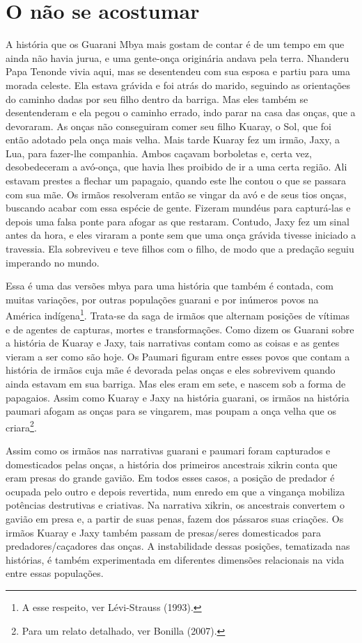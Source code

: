 \section{O não se acostumar}

A história que os Guarani Mbya mais gostam de contar é de um tempo em
que ainda não havia jurua, e uma gente-onça originária andava pela
terra. Nhanderu Papa Tenonde vivia aqui, mas se desentendeu com sua
esposa e partiu para uma morada celeste. Ela estava grávida e foi atrás
do marido, seguindo as orientações do caminho dadas por seu filho
dentro da barriga. Mas eles também se desentenderam e ela pegou o
caminho errado, indo parar na casa das onças, que a devoraram. As onças
não conseguiram comer seu filho Kuaray, o Sol, que foi então adotado
pela onça mais velha. Mais tarde Kuaray fez um irmão, Jaxy, a Lua, para
fazer-lhe companhia. Ambos caçavam borboletas e, certa vez,
desobedeceram a avó-onça, que havia lhes proibido de ir a uma certa
região. Ali estavam prestes a flechar um papagaio, quando este lhe
contou o que se passara com sua mãe. Os irmãos resolveram então se
vingar da avó e de seus tios onças, buscando acabar com essa espécie de
gente. Fizeram mundéus para capturá-las e depois uma falsa ponte para
afogar as que restaram. Contudo, Jaxy fez um sinal antes da hora, e
eles viraram a ponte sem que uma onça grávida tivesse iniciado a
travessia. Ela sobreviveu e teve filhos com o filho, de modo que a
predação seguiu imperando no mundo.

Essa é uma das versões mbya para uma história que também é contada, com
muitas variações, por outras populações guarani e por inúmeros povos na
América indígena\footnote{A esse respeito, ver Lévi-Strauss (1993).}.
Trata-se da saga de irmãos que alternam posições de vítimas e de
agentes de capturas, mortes e transformações. Como dizem os Guarani
sobre a história de Kuaray e Jaxy, tais narrativas contam como as
coisas e as gentes vieram a ser como são hoje. Os Paumari figuram entre
esses povos que contam a história de irmãos cuja mãe é devorada pelas
onças e eles sobrevivem quando ainda estavam em sua barriga. Mas eles
eram em sete, e nascem sob a forma de papagaios. Assim como Kuaray e
Jaxy na história guarani, os irmãos na história paumari afogam as onças
para se vingarem, mas poupam a onça velha que os criara\footnote{Para
um relato detalhado, ver Bonilla (2007).}.

Assim como os irmãos nas narrativas guarani e paumari foram capturados e
domesticados pelas onças, a história dos primeiros ancestrais xikrin
conta que eram presas do grande gavião. Em todos esses casos, a posição
de predador é ocupada pelo outro e depois revertida, num enredo em que
a vingança mobiliza potências destrutivas e criativas. Na narrativa
xikrin, os ancestrais convertem o gavião em presa e, a partir de suas
penas, fazem dos pássaros suas criações. Os irmãos Kuaray e Jaxy também
passam de presas/seres domesticados para predadores/caçadores das
onças. A instabilidade dessas posições, tematizada nas histórias, é
também experimentada em diferentes dimensões relacionais na vida entre
essas populações. 

